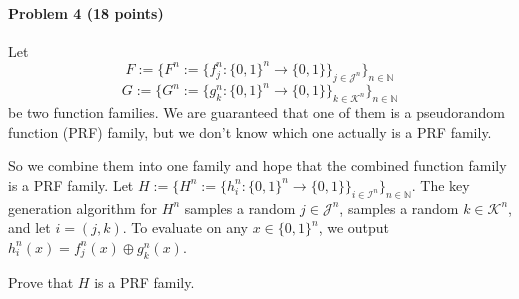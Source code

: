 \paragraph{Problem 4 (18 points)}
Let 
$$F:=\{ F^n:= \{ f^n_j: \{0,1\}^n \to \{0,1\} \}_{j\in \mathcal{J}^n} \}_{n\in\mathbb{N}}$$ 
$$G:=\{ G^n:= \{ g^n_k: \{0,1\}^n \to \{0,1\} \}_{k\in \mathcal{K}^n} \}_{n\in\mathbb{N}}$$ 
be two function families.
We are guaranteed that one of them is a pseudorandom function (PRF) family, but we don't know which one actually is a PRF family. 

So we combine them into one family and hope that the combined function family is a PRF family. 
Let $H:=\{ H^n:= \{ h^n_i: \{0,1\}^n \to \{0,1\} \}_{i\in \mathcal{I}^n} \}_{n\in\mathbb{N}}$. The key generation algorithm for $H^n$ samples a random $j\in \mathcal{J}^n$, samples a random $k\in \mathcal{K}^n$, and let $i = (j, k)$. To evaluate on any $x\in \{0,1\}^n$, we output $h^n_i(x) = f^n_j(x)\oplus g^n_k(x)$. 

Prove that $H$ is a PRF family. 